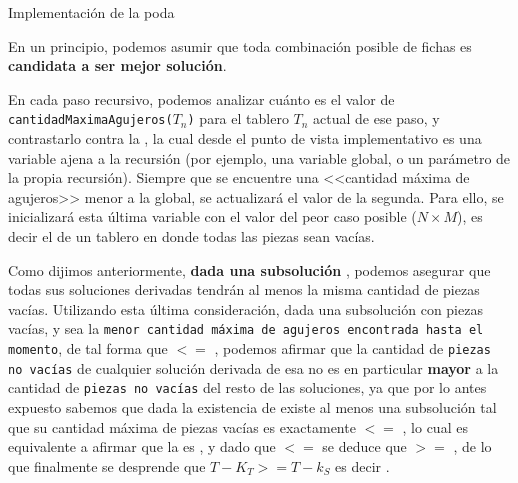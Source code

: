 \documentclass[11pt, a4paper, twoside]{article}
\begin{document}
\begin{paragraph}{Implementación de la poda\\}

En un principio, podemos asumir que toda combinación posible de fichas es
\textbf{candidata a ser mejor solución}.

En cada paso recursivo, podemos analizar cuánto es el valor de
\texttt{cantidadMaximaAgujeros($T_n$)} para el tablero $T_n$ actual de ese
paso, y contrastarlo contra la , la cual desde el punto de vista implementativo
es una variable ajena a la recursión (por ejemplo, una variable global, o un
parámetro de la propia recursión). Siempre que se encuentre una <<cantidad
máxima de agujeros>> menor a la global, se actualizará el valor de la segunda.
Para ello, se inicializará esta última variable con el valor del peor caso
posible ($N \times M$), es decir el de un tablero en donde todas las piezas
sean vacías.

Como dijimos anteriormente, \textbf{dada una subsolución }, podemos
asegurar que todas sus soluciones derivadas tendrán al menos la misma cantidad
de piezas vacías. Utilizando esta última consideración, dada una subsolución
con  piezas vacías, y sea  la
\texttt{menor cantidad máxima de agujeros encontrada hasta el momento}, de tal
forma que  $<=$ , podemos afirmar que la
cantidad de \texttt{piezas no vacías} de cualquier solución derivada de esa
 no es en particular \textbf{mayor} a la cantidad
de \texttt{piezas no vacías} del resto de las soluciones, ya que por lo antes
expuesto sabemos que dada la existencia de  existe al
menos una subsolución  tal que su cantidad máxima de piezas
vacías es exactamente  $<=$ , lo
cual es equivalente a afirmar que la  es , y dado que  $<=$ 
se deduce que  $>=$ , de lo que
finalmente se desprende que $T - K_{T} >= T - k_{S}$ es decir .


\end{paragraph}
\end{document}
